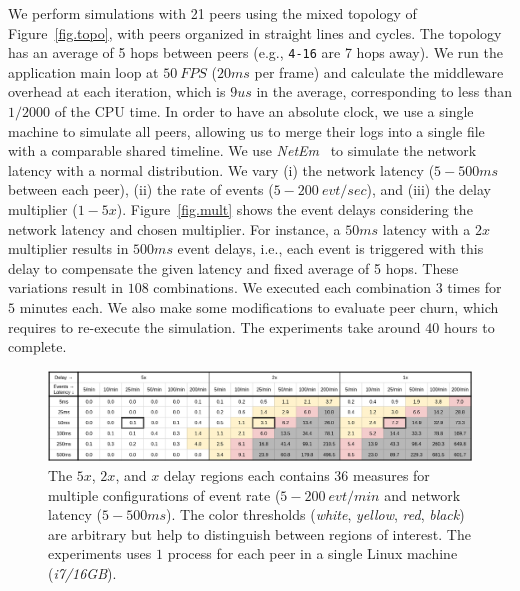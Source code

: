 \documentclass[fleqn,10pt]{SelfArx}
\newcommand{\code}[1]  {\texttt{\footnotesize{#1}}}
\begin{document}
We perform simulations with 21 peers using the mixed topology of
Figure~\ref{fig.topo}, with peers organized in straight lines and cycles.
The topology has an average of 5 hops between peers (e.g., \code{4-16} are 7
hops away).
%
We run the application main loop at $50~FPS$ ($20ms$ per frame) and calculate
the middleware overhead at each iteration, which is $9us$ in the average,
corresponding to less than $1/2000$ of the CPU time.
%
In order to have an absolute clock, we use a single machine to simulate all
peers, allowing us to merge their logs into a single file with a comparable
shared timeline.
%
We use \emph{NetEm}~\cite{netem} to simulate the network latency with a normal
distribution.
%
We vary
    (i)   the network latency ($5-500ms$ between each peer),
    (ii)  the rate of events ($5-200~evt/sec$), and
    (iii) the delay multiplier ($1-5x$).
%
Figure~\ref{fig.mult} shows the event delays considering the network latency
and chosen multiplier.
For instance, a $50ms$ latency with a $2x$ multiplier results in $500ms$ event
delays, i.e., each event is triggered with this delay to compensate the given
latency and fixed average of 5 hops.
%
These variations result in $108$ combinations.
We executed each combination $3$ times for $5$ minutes each.
We also make some modifications to evaluate peer churn, which requires to
re-execute the simulation.
The experiments take around $40$ hours to complete.


\begin{figure}
  \centering
  \includegraphics[width=\linewidth]{baks}
  \caption{
    \label{fig.baks}
The $5x$, $2x$, and $x$ delay regions each contains $36$ measures for multiple
configurations of event rate ($5-200~evt/min$ and network latency ($5-500ms$).
%
The color thresholds (\emph{white}, \emph{yellow}, \emph{red}, \emph{black})
are arbitrary but help to distinguish between regions of interest.
%
The experiments uses $1$ process for each peer in a single Linux machine
(\emph{i7/16GB}).
    }
\end{figure}
\end{document}
